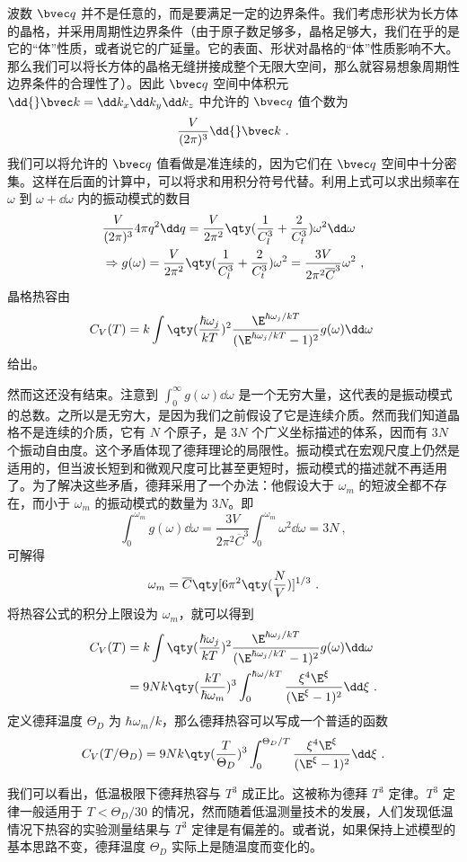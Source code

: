 波数 $\bvec q$ 并不是任意的，而是要满足一定的边界条件。我们考虑形状为长方体的晶格，并采用周期性边界条件（由于原子数足够多，晶格足够大，我们在乎的是它的“体”性质，或者说它的广延量。它的表面、形状对晶格的“体”性质影响不大。那么我们可以将长方体的晶格无缝拼接成整个无限大空间，那么就容易想象周期性边界条件的合理性了）。因此 $\bvec q$ 空间中体积元 $\dd{} \bvec k=\dd k_x\dd k_y\dd k_z$ 中允许的 $\bvec q$ 值个数为
\begin{equation}
\frac{V}{(2\pi)^3} \dd{} \bvec k~.
\end{equation}
我们可以将允许的 $\bvec q$ 值看做是准连续的，因为它们在 $\bvec q$ 空间中十分密集。这样在后面的计算中，可以将求和用积分符号代替。利用上式可以求出频率在 $\omega$ 到 $\omega+\dd \omega$ 内的振动模式的数目
\begin{equation}
\begin{aligned}
&\frac{V}{(2\pi)^3}4\pi q^2\dd q=\frac{V}{2\pi^2}\qty(\frac{1}{C_l^3}+\frac{2}{C_t^3})\omega^2\dd \omega\\
&\Rightarrow g(\omega)= \frac{V}{2\pi^2}\qty(\frac{1}{C_l^3}+\frac{2}{C_t^3}) \omega^2=\frac{3V}{2\pi^2 \overline C ^3} \omega^2~,
\end{aligned}
\end{equation}
晶格热容由
\begin{equation}
C_V(T)=k \int \qty(\frac{\hbar\omega_j}{kT})^2\frac{\E^{\hbar \omega_j/kT}}{(\E^{\hbar\omega_j/kT}-1)^2} g(\omega)\dd \omega~
\end{equation}
给出。

然而这还没有结束。注意到 $\int_0^\infty g(\omega)\dd \omega$ 是一个无穷大量，这代表的是振动模式的总数。之所以是无穷大，是因为我们之前假设了它是连续介质。然而我们知道晶格不是连续的介质，它有 $N$ 个原子，是 $3N$ 个广义坐标描述的体系，因而有 $3N$ 个振动自由度。这个矛盾体现了德拜理论的局限性。振动模式在宏观尺度上仍然是适用的，但当波长短到和微观尺度可比甚至更短时，振动模式的描述就不再适用了。为了解决这些矛盾，德拜采用了一个办法：他假设大于 $\omega_m$ 的短波全都不存在，而小于 $\omega_m$ 的振动模式的数量为 $3N$。即
\begin{equation}
\int_0^{\omega_m} g(\omega)\dd \omega = \frac{3V}{2\pi^2\overline C^3}\int_0^{\omega_m}\omega^2\dd \omega =3N~,
\end{equation}
可解得
\begin{equation}
\omega_m = \overline C \qty[6\pi^2 \qty(\frac{N}{V})]^{1/3}~.
\end{equation}
将热容公式的积分上限设为 $\omega_m$，就可以得到
\begin{equation}
\begin{aligned}
C_V(T)&=k \int \qty(\frac{\hbar\omega_j}{kT})^2\frac{\E^{\hbar \omega_j/kT}}{(\E^{\hbar\omega_j/kT}-1)^2} g(\omega)\dd \omega\\
&=9Nk\qty(\frac{kT}{\hbar\omega_m})^3 \int_0^{\hbar\omega/kT} \frac{\xi^4 \E^\xi}{(\E^\xi-1)^2}\dd \xi~.
\end{aligned}
\end{equation}
定义德拜温度 $\Theta_D$ 为 $\hbar\omega_m/k$，那么德拜热容可以写成一个普适的函数
\begin{equation}
C_V(T/\Theta_D)=9Nk\qty(\frac{T}{\Theta_D})^3 \int_0^{\Theta_D/T}\frac{\xi^4 \E^{\xi}}{(\E^\xi-1)^2}\dd \xi~.
\end{equation}

我们可以看出，低温极限下德拜热容与 $T^3$ 成正比。这被称为德拜 $T^3$ 定律。$T^3$ 定律一般适用于 $T<\Theta_D/30$ 的情况，然而随着低温测量技术的发展，人们发现低温情况下热容的实验测量结果与 $T^3$ 定律是有偏差的。或者说，如果保持上述模型的基本思路不变，德拜温度 $\Theta_D$ 实际上是随温度而变化的。
